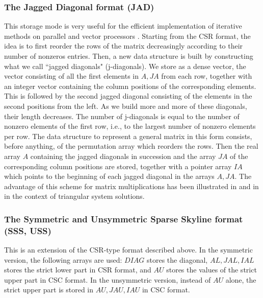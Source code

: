\documentclass[12pt]{article}
\begin{document}
\subsubsection{The Jagged Diagonal format (JAD)} 
This storage mode is very useful for the efficient implementation
of iterative methods on  parallel and vector processors
\cite{Saad-Boeing}. Starting from the CSR format, the idea is to 
first reorder the rows of the matrix decreasingly according to their 
number of nonzeros entries. Then, a new data structure is built 
by constructing what we call ``jagged diagonals" (j-diagonals).
We store as a dense vector, the vector consisting of all
the first elements in $A, JA$ from each row, together with an integer 
vector containing the column positions of the corresponding 
elements. This is followed by the second jagged  diagonal consisting of the
elements in the second positions from the left. As we build more and
more of these diagonals, their length decreases.  The number of
j-diagonals is equal to the number of nonzero elements of the first
row, i.e., to the largest number of nonzero elements per row.  The
data structure to represent a general matrix in this form consists,
before anything, of the permutation array which reorders the rows.
Then the real array $A$ containing the jagged diagonals in succession
and the array $JA$ of the corresponding column positions are stored,
together with a pointer array $ IA $ which points to the beginning of
each jagged diagonal in the arrays $A, JA$. The advantage of this
scheme for matrix multiplications has been illustrated in
\cite{Saad-Boeing} and in \cite{Anderson-Saad} in the 
context of triangular system solutions.

\subsubsection{The Symmetric and Unsymmetric Sparse Skyline format
(SSS, USS)} 

This is an extension of the CSR-type format described above.
In the symmetric version, the following arrays are used:
$DIAG$ stores the diagonal,
$AL, JAL, IAL$ stores the strict lower part in CSR format, and
$AU$ stores the values of the strict upper part in CSC format.
In the unsymmetric version, instead of $AU$ alone, the strict upper part
is stored in $AU, JAU, IAU$ in CSC format.
\end{document}
